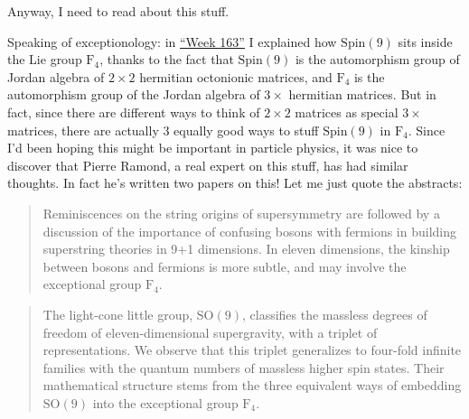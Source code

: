 \documentclass{article}
\def\tightlist{}
\renewcommand{\texttt}[1]{%
  \begingroup
  \ttfamily
  \begingroup\lccode`~=`/\lowercase{\endgroup\def~}{/\discretionary{}{}{}}%
  \begingroup\lccode`~=`[\lowercase{\endgroup\def~}{[\discretionary{}{}{}}%
  \begingroup\lccode`~=`.\lowercase{\endgroup\def~}{.\discretionary{}{}{}}%
  \catcode`/=\active\catcode`[=\active\catcode`.=\active
  \scantokens{#1\noexpand}%
  \endgroup
}
\begin{document}
Anyway, I need to read about this stuff.

Speaking of exceptionology: in \protect\hyperlink{week163}{``Week 163''}
I explained how \(\mathrm{Spin}(9)\) sits inside the Lie group
\(\mathrm{F}_4\), thanks to the fact that \(\mathrm{Spin}(9)\) is the
automorphism group of Jordan algebra of \(2\times2\) hermitian
octonionic matrices, and \(\mathrm{F}_4\) is the automorphism group of
the Jordan algebra of \(3\times\) hermitian matrices. But in fact, since
there are different ways to think of \(2\times2\) matrices as special
\(3\times\) matrices, there are actually 3 equally good ways to stuff
\(\mathrm{Spin}(9)\) in \(\mathrm{F}_4\). Since I'd been hoping this
might be important in particle physics, it was nice to discover that
Pierre Ramond, a real expert on this stuff, has had similar thoughts. In
fact he's written two papers on this! Let me just quote the abstracts:


\begin{quote}
Reminiscences on the string origins of supersymmetry are followed by a
discussion of the importance of confusing bosons with fermions in
building superstring theories in 9+1 dimensions. In eleven dimensions,
the kinship between bosons and fermions is more subtle, and may involve
the exceptional group \(\mathrm{F}_4\).
\end{quote}


\begin{quote}
The light-cone little group, \(\mathrm{SO}(9)\), classifies the massless
degrees of freedom of eleven-dimensional supergravity, with a triplet of
representations. We observe that this triplet generalizes to four-fold
infinite families with the quantum numbers of massless higher spin
states. Their mathematical structure stems from the three equivalent
ways of embedding \(\mathrm{SO}(9)\) into the exceptional group
\(\mathrm{F}_4\).
\end{quote}
\end{document}
